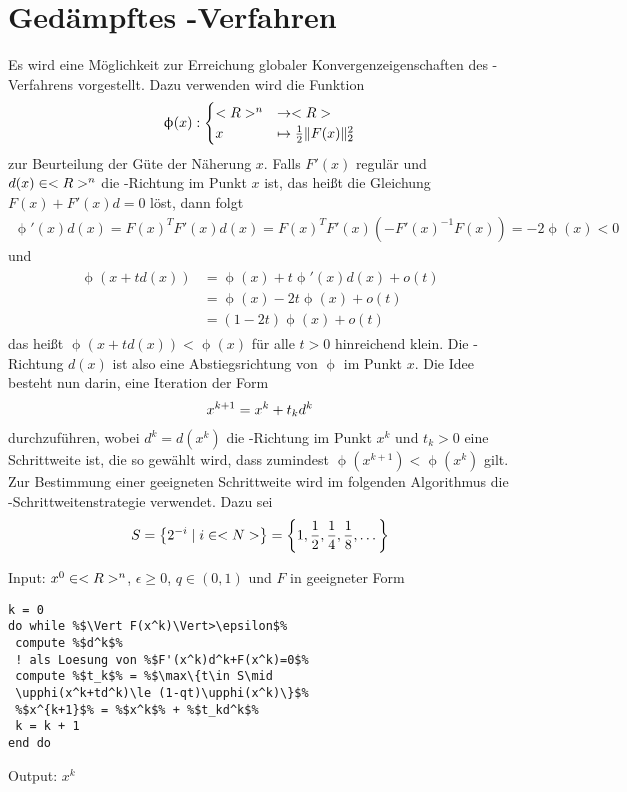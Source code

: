 \section{Gedämpftes -Verfahren}

Es wird eine Möglichkeit zur Erreichung globaler Konvergenzeigenschaften des -Verfahrens vorgestellt. Dazu verwenden wird die Funktion
\begin{align}
	\upphi(x): \begin{cases}
		<R>^n&\to <R> \\
		x&\mapsto \frac{1}{2}\Vert F(x)\Vert_2^2
	\end{cases}\notag
\end{align}
zur Beurteilung der Güte der Näherung $x$. Falls $F'(x)$ regulär und $d(x)\in<R>^n$ die -Richtung im Punkt $x$ ist, das heißt die Gleichung $F(x)+F'(x)d=0$ löst, dann folgt
\begin{align}
	\label{5.6}
	\upphi'(x)d(x) = F(x)^TF'(x)d(x) = F(x)^TF'(x)\left(-F'(x)^{-1}F(x)\right) = -2\upphi(x)< 0
\end{align}
und
\begin{align}
	\label{5.7}
	\begin{split}
		\upphi(x+td(x)) &= \upphi(x) + t\upphi'(x)d(x)+o(t) \\
		&= \upphi(x) - 2t\upphi(x) + o(t) \\
		&= (1-2t)\upphi(x) + o(t)
	\end{split}
\end{align}
das heißt $\upphi(x+td(x))<\upphi(x)$ für alle $t>0$ hinreichend klein. Die -Richtung $d(x)$ ist also eine Abstiegsrichtung von $\upphi$ im Punkt $x$. Die Idee besteht nun darin, eine Iteration der Form
\begin{align}
	x^{k+1} = x^k + t_kd^k\notag
\end{align}
durchzuführen, wobei $d^k=d(x^k)$ die -Richtung im Punkt $x^k$ und $t_k>0$ eine Schrittweite ist, die so gewählt wird, dass zumindest $\upphi(x^{k+1})<\upphi(x^k)$ gilt. Zur Bestimmung einer geeigneten Schrittweite wird im folgenden Algorithmus die -Schrittweitenstrategie verwendet. Dazu sei
\begin{align}
	S = \left\lbrace 2^{-i}\mid i\in<N>\right\rbrace = \left\lbrace 1, \frac{1}{2}, \frac{1}{4}, \frac{1}{8}, \dots\right\rbrace \notag
\end{align}

\begin{algorithm}
	Input: $x^0\in<R>^n$, $\epsilon\ge 0$, $q\in (0,1)$ und $F$ in geeigneter Form
	\begin{lstlisting}
k = 0
do while %$\Vert F(x^k)\Vert>\epsilon$%
 compute %$d^k$%
 ! als Loesung von %$F'(x^k)d^k+F(x^k)=0$%
 compute %$t_k$% = %$\max\{t\in S\mid 
 \upphi(x^k+td^k)\le (1-qt)\upphi(x^k)\}$%
 %$x^{k+1}$% = %$x^k$% + %$t_kd^k$%
 k = k + 1
end do
	\end{lstlisting}
	Output: $x^k$
\end{algorithm}

